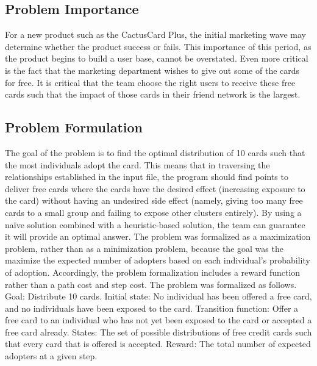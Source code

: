 \documentclass[11pt,journal]{IEEEtran}
\begin{document}
\subsection{Problem Importance}
For a new product such as the CactusCard Plus, the initial marketing wave may determine whether the product success or fails. This importance of this period, as the product begins to build a user base, cannot be overstated. Even more critical is the fact that the marketing department wishes to give out some of the cards for free. It is critical that the team choose the right users to receive these free cards such that the impact of those cards in their friend network is the largest.

\subsection{Problem Formulation}
The goal of the problem is to find the optimal distribution of 10 cards such that the most individuals adopt the card. This means that in traversing the relationships established in the input file, the program should find points to deliver free cards where the cards have the desired effect (increasing exposure to the card) without having an undesired side effect (namely, giving too many free cards to a small group and failing to expose other clusters entirely). By using a na{\"i}ve solution combined with a heuristic-based solution, the team can guarantee it will provide an optimal answer. The problem was formalized as a maximization problem, rather than as a minimization problem, because the goal was the maximize the expected number of adopters based on each individual's probability of adoption. Accordingly, the problem formalization includes a reward function rather than a path cost and step cost. The problem was formalized as follows. Goal: Distribute 10 cards. Initial state: No individual has been offered a free card, and no individuals have been exposed to the card. Transition function: Offer a free card to an individual who has not yet been exposed to the card or accepted a free card already. States: The set of possible distributions of free credit cards such that every card that is offered is accepted. Reward: The total number of expected adopters at a given step.
\end{document}
